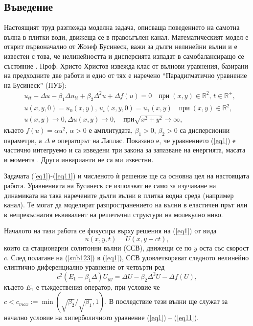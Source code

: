 \documentclass[a4paper]{article}
\newcommand{\be}{\begin{equation}}
\newcommand{\ee}{\end{equation}}
\newcommand{\rf}[1]{(\ref{#1})}
\newcommand{\RR}{\mathbb{R}}
\theoremstyle{remark}
\begin{document}
\begin{large}
\section{Въведение}\label{introduction}
Настоящият труд разглежда моделна задача, описваща поведението на самотна вълна в плитки води, движеща се в правоъгълен канал. Математическият модел е открит първоначално от Жозеф Бусинеск, важи за дълги нелинейни вълни и е известен с това, че нелинейността и дисперсията изпадат в самобалансиращо се състояние \cite{ref01,ref02}. Проф. Христо Христов \cite{ref1} извежда клас от вълнови уравнения, базирани на предходните две работи и едно от тях е наречено ``Парадигматично уравнение на Бусинеск'' (ПУБ):
\begin{align}
&u_{tt} - \Delta u -\beta_1  \Delta u_{tt} +\beta_2 \Delta ^2 u + \Delta f(u)=0   \quad \text{при} \;  (x,y) \in \RR^2, \, t\in\RR^+,\label{eq1}
\\ \nonumber &u(x,y,0)=u_0(x,y), \, u_t(x,y,0)=u_1(x,y)   \quad\text{при} \; (x,y) \in \RR^2,
\\  &u(x,y) \rightarrow 0,  \Delta u(x,y) \rightarrow 0 ,  \quad \text{при}  \sqrt{x^2 + y^2} \rightarrow \infty, \label{eq11}
\end{align}
където $f(u)=\alpha u^2$, $\alpha>0$ е амплитудата, $\beta_1>0$, $\beta_2>0$ са дисперсионни параметри, а $\Delta$ е операторът на Лаплас. Показано е, че уравнението \rf{eq1} е частично интегруемо и са изведени три закона за запазване на енергията, масата и момента \cite{ref1, ref159}. Други инварианти не са ми известни. 

Задачата \rf{eq1}-\rf{eq11} и численото ѝ решение ще са основна цел на настоящата работа. Уравненията на Бусинеск се използват не само за изучаване на динамиката на така наречените дълги вълни в плитка водна среда (например канал). Те могат да моделират разпространението на вълни в еластичен прът или в непрекъснатия еквивалент на решетъчни структури на молекулно ниво.

Началото на тази работа се фокусира върху решения на \rf{eq1} от вида 
\be\label{sub123}
u(x,y,t)=U(x,y-ct),
\ee
които са стационарни солитонни вълни (ССВ), движещи се по $y$ оста със скорост $c$. След полагане на \rf{sub123} в \rf{eq1}, ССВ удовлетворяват следното нелинейно елиптично диференциално уравнение от четвърти ред
\begin{equation}\label{eq2}
c^2 (E_1-\beta_1 \Delta) U_{yy} = \Delta U -\beta_2 \Delta^2 U - \Delta f(U),
\end{equation}
където $E_1$ е тъждествения оператор, при условие че $c < c_{max}:=\min (\sqrt{\beta_2}/ \sqrt{\beta_1},1)$. В последствие тези вълни ще служат за начално условие на хиперболичното уравнение \rf{eq1} -- \rf{eq11}. 


\end{large}
\end{document}
